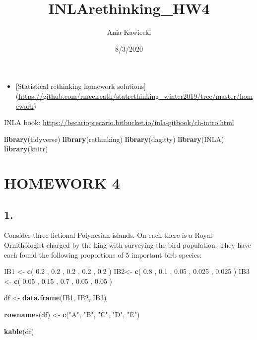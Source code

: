 \documentclass[
]{article}
\title{INLArethinking\_HW4}
\author{Ania Kawiecki}
\date{8/3/2020}
\newenvironment{Shaded}{\begin{snugshade}}{\end{snugshade}}
\newcommand{\FloatTok}[1]{\textcolor[rgb]{0.00,0.00,0.81}{#1}}
\newcommand{\KeywordTok}[1]{\textcolor[rgb]{0.13,0.29,0.53}{\textbf{#1}}}
\newcommand{\NormalTok}[1]{#1}
\newcommand{\StringTok}[1]{\textcolor[rgb]{0.31,0.60,0.02}{#1}}
\providecommand{\tightlist}{%
  \setlength{\itemsep}{0pt}\setlength{\parskip}{0pt}}
\begin{document}
\maketitle

\begin{itemize}
\tightlist
\item
  {[}Statistical rethinking homework solutions{]}
  (\url{https://github.com/rmcelreath/statrethinking_winter2019/tree/master/homework})
\end{itemize}

INLA book:
\url{https://becarioprecario.bitbucket.io/inla-gitbook/ch-intro.html}

\begin{Shaded}
\begin{Highlighting}[]
\KeywordTok{library}\NormalTok{(tidyverse)}
\KeywordTok{library}\NormalTok{(rethinking)}
\KeywordTok{library}\NormalTok{(dagitty)}
\KeywordTok{library}\NormalTok{(INLA)}
\KeywordTok{library}\NormalTok{(knitr)}
\end{Highlighting}
\end{Shaded}

\hypertarget{homework-4}{%
\section{HOMEWORK 4}\label{homework-4}}

\hypertarget{section}{%
\subsection{1.}\label{section}}

Consider three fictional Polynesian islands. On each there is a Royal
Ornithologist charged by the king with surveying the bird population.
They have each found the following proportions of 5 important birb
species:

\begin{Shaded}
\begin{Highlighting}[]
\NormalTok{IB1 <-}\StringTok{ }\KeywordTok{c}\NormalTok{( }\FloatTok{0.2}\NormalTok{ , }\FloatTok{0.2}\NormalTok{ , }\FloatTok{0.2}\NormalTok{ , }\FloatTok{0.2}\NormalTok{ , }\FloatTok{0.2}\NormalTok{ )}
\NormalTok{IB2<-}\StringTok{ }\KeywordTok{c}\NormalTok{( }\FloatTok{0.8}\NormalTok{ , }\FloatTok{0.1}\NormalTok{ , }\FloatTok{0.05}\NormalTok{ , }\FloatTok{0.025}\NormalTok{ , }\FloatTok{0.025}\NormalTok{ )}
\NormalTok{IB3 <-}\StringTok{ }\KeywordTok{c}\NormalTok{( }\FloatTok{0.05}\NormalTok{ , }\FloatTok{0.15}\NormalTok{ , }\FloatTok{0.7}\NormalTok{ , }\FloatTok{0.05}\NormalTok{ , }\FloatTok{0.05}\NormalTok{ )}

\NormalTok{df <-}\StringTok{ }\KeywordTok{data.frame}\NormalTok{(IB1, IB2, IB3)}

\KeywordTok{rownames}\NormalTok{(df) <-}\StringTok{ }\KeywordTok{c}\NormalTok{(}\StringTok{"A"}\NormalTok{, }\StringTok{"B"}\NormalTok{, }\StringTok{"C"}\NormalTok{, }\StringTok{"D"}\NormalTok{, }\StringTok{"E"}\NormalTok{)}

\KeywordTok{kable}\NormalTok{(df)}
\end{Highlighting}
\end{Shaded}
\end{document}
